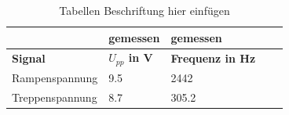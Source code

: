 
\begin{table}[h]
    \caption{Tabellen Beschriftung hier einfügen}
    \begin{tabular}{|>{}l |>{}l |>{}l |>{}l |>{}l |} %
        \hline & gemessen & gemessen \\ \hline
        \textbf{Signal} & \textbf{$U_{pp}$ in V} & \textbf{Frequenz in Hz} \\ \hline
        Rampenspannung & 9.5 & 2442  \\ \hline
        Treppenspannung & 8.7 & 305.2  \\ \hline
    \end{tabular}
\end{table}